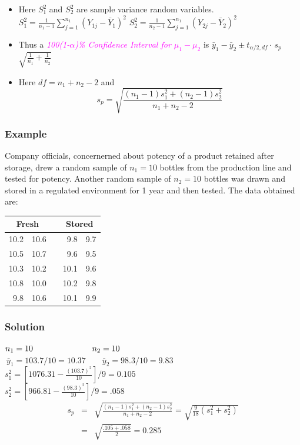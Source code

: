 \documentclass[xcolor=dvipsnames,12pt]{beamer}
\begin{document}
\begin{frame}
\begin{itemize}
\item Here  $S_1^2$ and $S_2^2$ are sample variance random variables.
  $S_1^2  = \frac{1}{n_1-1} \sum_{j=1}^{n_1} (Y_{1j} - \bar{Y}_1)^2$\quad \quad
 $ S_2^2 =  \frac{1}{n_2-1} \sum_{j=1}^{n_1} (Y_{2j} - \bar{Y}_2)^2$ \\[-.3in]
\item Thus a  \textcolor{magenta}{\textit{100(1-$\alpha$)\% Confidence Interval for $\mu_1 - \mu_2$}}
is
 $ \bar{y}_1 - \bar{y}_2 \pm t_{\alpha/2,df}\cdot \, s_p $
  $\sqrt{\frac{1}{n_1} + \frac{1}{n_2}} $
\item Here $df= n_1 + n_2 - 2$ and
$$
  s_p = \sqrt{\frac{(n_1-1)s_1^2+(n_2-1)s_2^2}{n_1 + n_2 - 2}}
$$
\end{itemize}
\end{frame}


\begin{frame}
\frametitle{{Example}}
 Company officials, concernerned about potency of a product retained after storage, drew a random sample of $n_1=10$ bottles from the production line and tested for potency. Another random sample of $n_2=10$ bottles was drawn and stored in a regulated environment for 1 year and then tested. The data obtained are:\\[.1in]
{\small 
\begin{center}
\begin{tabular}{rrrrr} \hline
\multicolumn{2}{c}{\textbf{Fresh}} & & 
\multicolumn{2}{c}{\textbf{Stored}} \\ \hline
10.2 & 10.6 & & 9.8 & 9.7 \\
10.5 & 10.7 & & 9.6 & 9.5 \\
10.3 & 10.2 & & 10.1 & 9.6 \\
10.8 & 10.0 & & 10.2 & 9.8 \\
9.8 & 10.6 & & 10.1 & 9.9 \\ \hline
\end{tabular}
\end{center}}
\end{frame}


\begin{frame}
\frametitle{Solution}
\hspace*{1in}$n_1 =10 \hspace*{1in} n_2 = 10 $\\[.15in]
\hspace*{.15in}$\ \bar{y}_1 =103.7/10= 10.37 \quad \quad   \bar{y}_2 =98.3/10= 9.83$ \\[.15in]
\hspace*{1in}$s_1^2 = [1076.31-\frac{(103.7)^2}{10}]/9=0.105$ \\[.15in]
\hspace*{1in}$s_2^2 =[966.81-\frac{(98.3)^2}{10}]/9= .058$ 
\begin{eqnarray*}
 s_p & = & \sqrt{\frac{(n_1-1)s_1^2+(n_2-1)s_2^2}{n_1 + n_2 - 2}}=\sqrt{\frac{9}{18} (s_1^2 + s_2^2)}\\[.15in]
& = &  \sqrt{\frac{.105+.058}{2}} = 0.285
\end{eqnarray*}
\end{frame}
\end{document}
